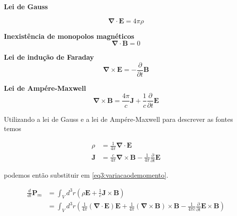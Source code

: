 \begin{tcolorbox}[title=Equações de Maxwell, colframe=blue, colback=blue!5!white, coltitle=white, fonttitle=\bfseries]
	
	\textbf{Lei de Gauss}
	
	\begin{equation}
		\mathbf{\nabla} \cdot \textbf{E}  = 4 \pi \rho
		\label{eq3:leidegauss}
	\end{equation}
	
	\textbf{Inexistência de monopolos magnéticos}
	\begin{equation}
		\mathbf{\nabla} \cdot \textbf{B} = 0
		\label{eq3:monopolos}
	\end{equation}
	
	\textbf{Lei de indução de Faraday}
	\begin{equation}
		\mathbf{\nabla} \times \textbf{E} = - \frac{\partial}{\partial t} \textbf{B}
		\label{eq3:leidefaraday}
	\end{equation}
	
	\textbf{Lei de Ampére-Maxwell}
	\begin{equation}
		\mathbf{\nabla} \times \textbf{B} = \frac{4\pi}{c} \textbf{J} +  \frac{1}{c}\frac{\partial}{\partial t}\textbf{E}
		\label{leideampere}
	\end{equation}
	
\end{tcolorbox}


Utilizando a lei de Gauss e a lei de Ampére-Maxwell para descrever as fontes temos

\begin{equation}
	\begin{split}
		\rho & = \frac{1}{4\pi}\mathbf{\nabla} \cdot \textbf{E} \\
		\textbf{J} & = \frac{c}{4\pi} \mathbf{\nabla} \times \textbf{B} - \frac{1}{4\pi}\frac{\partial}{\partial t}\textbf{E}
	\end{split}
\end{equation}

podemos então substituir em \ref{eq3:variacaodemomento}.

\begin{equation}
	\begin{split}
		\frac{d}{dt} \textbf{P}_m & = \int_V d^3 r \left( \rho \textbf{E} + \frac{1}{c} \textbf{J} \times \textbf{B} \right) \\
		& = \int_V d^3 r \left( \frac{1}{4\pi}\left( \mathbf{\nabla} \cdot \textbf{E}\right)  \textbf{E} + \frac{1}{4\pi} \left( \mathbf{\nabla} \times \textbf{B}\right) \times \textbf{B} - \frac{1}{4\pi c}\frac{\partial}{\partial t}\textbf{E} \times \textbf{B} \right)
	\end{split}
	\label{eq3:semfontes}
\end{equation}


